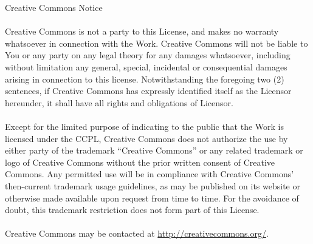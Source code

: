     Creative Commons Notice
\\ \\
    Creative Commons is not a party to this License, and makes no warranty
    whatsoever in connection with the Work. Creative Commons will not be liable
    to You or any party on any legal theory for any damages whatsoever,
    including without limitation any general, special, incidental or
    consequential damages arising in connection to this license. Notwithstanding
    the foregoing two (2) sentences, if Creative Commons has expressly
    identified itself as the Licensor hereunder, it shall have all rights and
    obligations of Licensor.
\\ \\
    Except for the limited purpose of indicating to the public that the Work is
    licensed under the CCPL, Creative Commons does not authorize the use by
    either party of the trademark ``Creative Commons'' or any related trademark or
    logo of Creative Commons without the prior written consent of Creative
    Commons. Any permitted use will be in compliance with Creative Commons'
    then-current trademark usage guidelines, as may be published on its website
    or otherwise made available upon request from time to time. For the
    avoidance of doubt, this trademark restriction does not form part of this
    License.
\\ \\
    Creative Commons may be contacted at \url{http://creativecommons.org/}.
